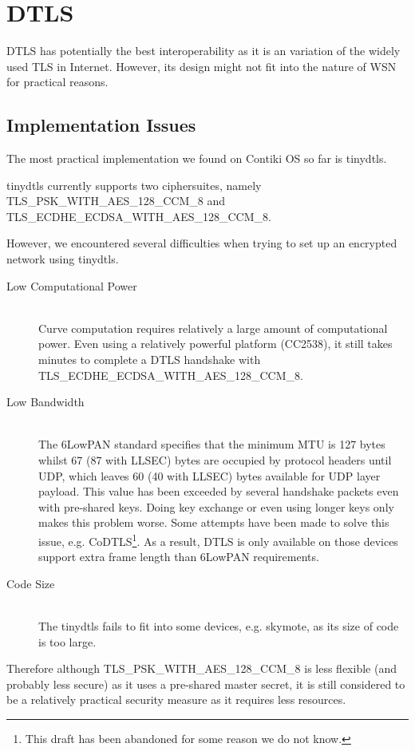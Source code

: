 \chapter{DTLS} \label{Chp: DTLS}
DTLS has potentially the best interoperability as it is an variation of the widely used TLS in Internet. However, its design might not fit into the nature of WSN for practical reasons.

\section{Implementation Issues}
The most practical implementation we found on Contiki OS so far is tinydtls.

tinydtls\cite{tinydtls} currently supports two ciphersuites, namely TLS\_PSK\_WITH\_AES\_128\_CCM\_8 and TLS\_ECDHE\_ECDSA\_WITH\_AES\_128\_CCM\_8. 

However, we encountered several difficulties when trying to set up an encrypted network using tinydtls.

\begin{description}
\item[Low Computational Power] \hfill \\
Curve computation requires relatively a large amount of computational power. Even using a relatively powerful platform (CC2538), it still takes minutes to complete a DTLS handshake with
TLS\_ECDHE\_ECDSA\_WITH\_AES\_128\_CCM\_8.

\item[Low Bandwidth] \hfill \\
The 6LowPAN standard specifies that the minimum MTU is 127 bytes whilst 67 (87 with LLSEC) bytes are occupied by protocol headers until UDP, which leaves 60 (40 with LLSEC) bytes available for UDP layer payload. This value has been exceeded by several handshake packets even with pre-shared keys. Doing key exchange or even using longer keys only makes this problem worse. Some attempts have been made to solve this issue, e.g. CoDTLS\cite{CoDTLS}\footnote{This draft has been abandoned for some reason we do not know.}. As a result, DTLS is only available on those devices support extra frame length than 6LowPAN requirements.

\item[Code Size] \hfill \\
The tinydtls fails to fit into some devices, e.g. skymote, as its size of code is too large.
\end{description}

Therefore although TLS\_PSK\_WITH\_AES\_128\_CCM\_8 is less flexible (and probably less secure) as it uses a pre-shared master secret, it is still considered to be a relatively practical security measure as it requires less resources.

